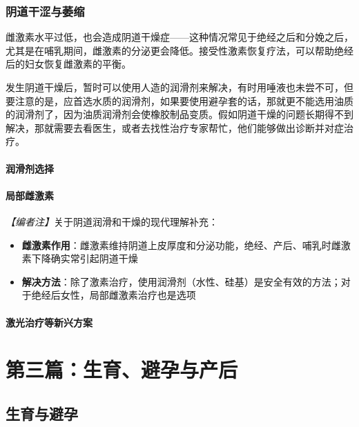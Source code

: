 \begin{enumerate}

\section{阴道干涩与萎缩}

雌激素水平过低，也会造成阴道干燥症——这种情况常见于绝经之后和分娩之后，尤其是在哺乳期间，雌激素的分泌更会降低。接受性激素恢复疗法，可以帮助绝经后的妇女恢复雌激素的平衡。

发生阴道干燥后，暂时可以使用人造的润滑剂来解决，有时用唾液也未尝不可，但要注意的是，应首选水质的润滑剂，如果要使用避孕套的话，那就更不能选用油质的润滑剂了，因为油质润滑剂会使橡胶制品变质。假如阴道干燥的问题长期得不到解决，那就需要去看医生，或者去找性治疗专家帮忙，他们能够做出诊断并对症治疗。

\subsection{润滑剂选择}
\subsection{局部雌激素}

\noindent\textit{【编者注】}关于阴道润滑和干燥的现代理解补充：
\begin{itemize}
	\item \textbf{雌激素作用}：雌激素维持阴道上皮厚度和分泌功能，绝经、产后、哺乳时雌激素下降确实常引起阴道干燥
	\item \textbf{解决方法}：除了激素治疗，使用润滑剂（水性、硅基）是安全有效的方法；对于绝经后女性，局部雌激素治疗也是选项
\end{itemize}

\subsection{激光治疗等新兴方案}

\part{第三篇：生育、避孕与产后}

\chapter{生育与避孕}


\end{enumerate}
